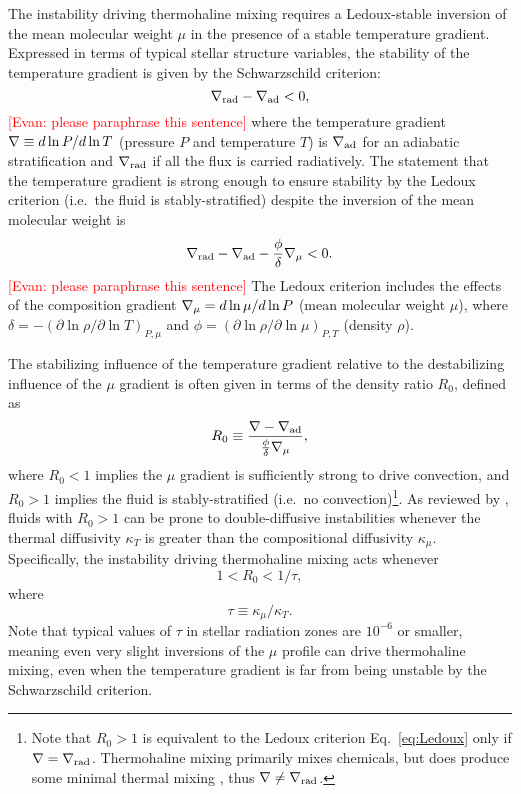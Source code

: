 The instability driving thermohaline mixing requires a Ledoux-stable inversion of the mean molecular weight $\mu$ in the presence of a stable temperature gradient. 
Expressed in terms of typical stellar structure variables, the stability of the temperature gradient is given by the Schwarzschild criterion:
\begin{equation} \label{eq:Schwarzschild}
    \gradrad - \gradad < 0,
\end{equation}
\textcolor{red}{[Evan: please paraphrase this sentence]} where the temperature gradient $\nabla \equiv d \ln P / d \ln T$ (pressure $P$ and temperature $T$) is $\nabla_{\rm{ad}}$ for an adiabatic stratification and $\nabla_{\rm{rad}}$ if all the flux is carried radiatively. 
The statement that the temperature gradient is strong enough to ensure stability by the Ledoux criterion (i.e.~the fluid is stably-stratified) despite the inversion of the mean molecular weight is
\begin{equation} \label{eq:Ledoux}
    \gradrad - \gradad - \frac{\phi}{\delta}\gradmu < 0.
\end{equation}
\textcolor{red}{[Evan: please paraphrase this sentence]} The Ledoux criterion includes the effects of the composition gradient $\nabla_{\mu} = d\ln\mu/d\ln P$ (mean molecular weight $\mu$), where $\delta = -(\partial \ln \rho / \partial \ln T)_{P,\mu}$ and $\phi = (\partial \ln \rho / \partial \ln\mu)_{P,T}$ (density $\rho$).

The stabilizing influence of the temperature gradient relative to the destabilizing influence of the $\mu$ gradient is often given in terms of the density ratio $R_0$, defined as
\begin{equation} \label{eq:R0}
    R_0 \equiv \frac{\grad - \gradad}{\frac{\phi}{\delta} \gradmu},
\end{equation}
where $R_0 < 1$ implies the $\mu$ gradient is sufficiently strong to drive convection, and $R_0 > 1$ implies the fluid is stably-stratified (i.e.~no convection)\footnote{Note that $R_0>1$ is equivalent to the Ledoux criterion Eq.~\eqref{eq:Ledoux} only if $\nabla = \nabla_{\rm{rad}}$. Thermohaline mixing primarily mixes chemicals, but does produce some minimal thermal mixing \citep[see, e.g., Fig.~4 of][]{brown_etal_2013}, thus $\nabla \neq \nabla_{\rm{rad}}$.}. 
As reviewed by \citet{garaud_DDC_review_2018}, fluids with $R_0 > 1$ can be prone to double-diffusive instabilities whenever the thermal diffusivity $\kappa_T$ is greater than the compositional diffusivity $\kappa_\mu$. Specifically, the instability driving thermohaline mixing acts whenever
\begin{equation} \label{eq:R0_condition}
1 < R_0 < 1/\tau,
\end{equation}
\citep{baines_gill_1969} where
\begin{equation} \label{eq:tau}
    \tau \equiv \kappa_\mu/\kappa_T.
\end{equation}
Note that typical values of $\tau$ in stellar radiation zones are $10^{-6}$ or smaller, meaning even very slight inversions of the $\mu$ profile can drive thermohaline mixing, even when the temperature gradient is far from being unstable by the Schwarzschild criterion.

